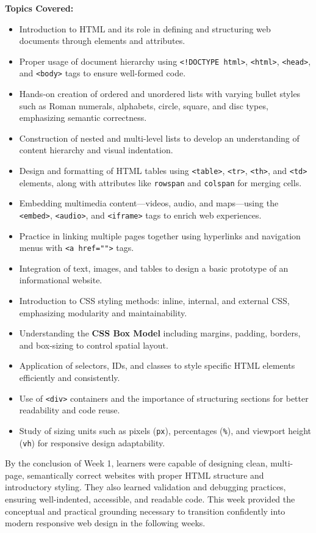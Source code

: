 \documentclass[a4paper,12pt,oneside]{report}
\numberwithin{equation}{chapter}
\numberwithin{figure}{chapter}
\numberwithin{table}{chapter}
\begin{document}
\textbf{Topics Covered:}
\begin{itemize}
    \item Introduction to HTML and its role in defining and structuring web documents through elements and attributes.
    \item Proper usage of document hierarchy using \texttt{<!DOCTYPE html>}, \texttt{<html>}, \texttt{<head>}, and \texttt{<body>} tags to ensure well-formed code.
    \item Hands-on creation of ordered and unordered lists with varying bullet styles such as Roman numerals, alphabets, circle, square, and disc types, emphasizing semantic correctness.
    \item Construction of nested and multi-level lists to develop an understanding of content hierarchy and visual indentation.
    \item Design and formatting of HTML tables using \texttt{<table>}, \texttt{<tr>}, \texttt{<th>}, and \texttt{<td>} elements, along with attributes like \texttt{rowspan} and \texttt{colspan} for merging cells.
    \item Embedding multimedia content—videos, audio, and maps—using the \texttt{<embed>}, \texttt{<audio>}, and \texttt{<iframe>} tags to enrich web experiences.
    \item Practice in linking multiple pages together using hyperlinks and navigation menus with \texttt{<a href="">} tags.
    \item Integration of text, images, and tables to design a basic prototype of an informational website.
    \item Introduction to CSS styling methods: inline, internal, and external CSS, emphasizing modularity and maintainability.
    \item Understanding the \textbf{CSS Box Model} including margins, padding, borders, and box-sizing to control spatial layout.
    \item Application of selectors, IDs, and classes to style specific HTML elements efficiently and consistently.
    \item Use of \texttt{<div>} containers and the importance of structuring sections for better readability and code reuse.
    \item Study of sizing units such as pixels (\texttt{px}), percentages (\texttt{\%}), and viewport height (\texttt{vh}) for responsive design adaptability.
\end{itemize}

By the conclusion of Week 1, learners were capable of designing clean, multi-page, semantically correct websites with proper HTML structure and introductory styling. They also learned validation and debugging practices, ensuring well-indented, accessible, and readable code. This week provided the conceptual and practical grounding necessary to transition confidently into modern responsive web design in the following weeks.
\end{document}

